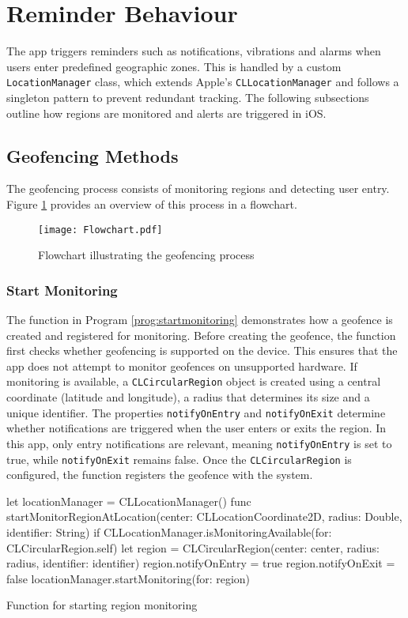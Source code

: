 \section{Reminder Behaviour}
The app triggers reminders such as notifications, vibrations and alarms when users enter predefined geographic zones.
This is handled by a custom \lstinline{LocationManager} class, which extends Apple's \lstinline{CLLocationManager} and follows a singleton pattern to prevent redundant tracking.
The following subsections outline how regions are monitored and alerts are triggered in iOS.

\subsection{Geofencing Methods}
The geofencing process consists of monitoring regions and detecting user entry.
Figure \ref{fig:flow} provides an overview of this process in a flowchart.

\begin{figure}[H]
    \centering
    \texttt{[image: Flowchart.pdf]}
    \caption{Flowchart illustrating the geofencing process}
    \label{fig:flow}
\end{figure}

\subsubsection{Start Monitoring}
The function in Program \ref{prog:startmonitoring} demonstrates how a geofence is created and registered for monitoring.
Before creating the geofence, the function first checks whether geofencing is supported on the device. 
This ensures that the app does not attempt to monitor geofences on unsupported hardware. 
If monitoring is available, a \lstinline{CLCircularRegion} object is created using a central coordinate (latitude and longitude), a radius that determines its size and a unique identifier. 
The properties \lstinline{notifyOnEntry} and \lstinline{notifyOnExit} determine whether notifications are triggered when the user enters or exits the region. 
In this app, only entry notifications are relevant, meaning \lstinline{notifyOnEntry} is set to true, while \lstinline{notifyOnExit} remains false.
Once the \lstinline{CLCircularRegion} is configured, the function registers the geofence with the system.

\begin{program}[htbp]
\begin{SwiftCode}
let locationManager = CLLocationManager()
func startMonitorRegionAtLocation(center: CLLocationCoordinate2D, radius: Double, identifier: String) {
    if CLLocationManager.isMonitoringAvailable(for: CLCircularRegion.self) {
        let region = CLCircularRegion(center: center, radius: radius, identifier: identifier)
        region.notifyOnEntry = true
        region.notifyOnExit = false
        locationManager.startMonitoring(for: region)
    }
}\end{SwiftCode}
\caption{Function for starting region monitoring}
\label{prog:startmonitoring}
\end{program}

